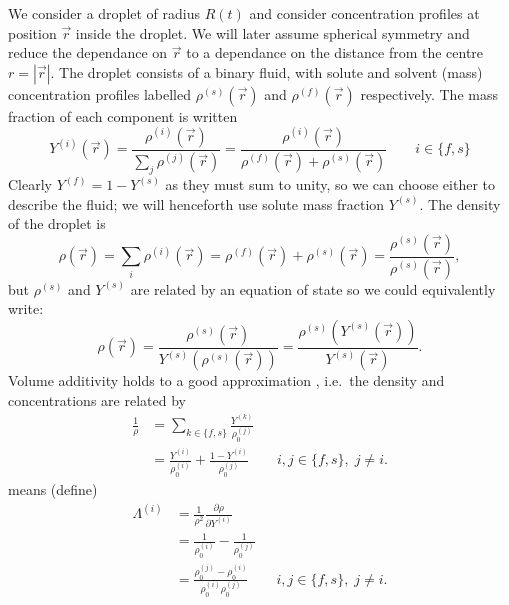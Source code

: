 \documentclass[12pt,twoside]{report}
\begin{document}
We consider a droplet of radius $R(t)$ and consider concentration profiles at position $\vec{r}$ inside the droplet.
We will later assume spherical symmetry and reduce the dependance on $\vec{r}$ to a dependance on the distance from the centre $r = |\vec{r}|$.
The droplet consists of a binary fluid, with solute and solvent (mass) concentration profiles labelled $\rho^{(s)}(\vec{r})$ and $\rho^{(f)}(\vec{r})$ respectively.
The mass fraction of each component is written
\begin{equation}\label{eq:mass-fraction}
  Y^{(i)}(\vec{r}) = \frac{\rho^{(i)}(\vec{r})}{\sum_j \rho^{(j)}(\vec{r})} = \frac{\rho^{(i)}(\vec{r})}{\rho^{(f)}(\vec{r}) + \rho^{(s)}(\vec{r})} \qquad i \in \{f, s\}
\end{equation}
Clearly $Y^{(f)} = 1 - Y^{(s)}$ as they must sum to unity, so we can choose either to describe the fluid;
we will henceforth use solute mass fraction $Y^{(s)}$.
The density of the droplet is
\begin{equation}
  \rho(\vec{r}) = \sum_i \rho^{(i)}(\vec{r}) = \rho^{(f)}(\vec{r}) + \rho^{(s)}(\vec{r}) = \frac{\rho^{(s)}(\vec{r})}{\rho^{(s)}(\vec{r})},
\end{equation}
but $\rho^{(s)}$ and $Y^{(s)}$ are related by an equation of state so we could equivalently write:
\begin{equation}
  \rho(\vec{r}) =
  \frac{\rho^{(s)}(\vec{r})}{Y^{(s)}(\rho^{(s)}(\vec{r}))} =
  \frac{\rho^{(s)}(Y^{(s)}(\vec{r}))}{Y^{(s)}(\vec{r})}.
\end{equation}
Volume additivity holds to a good approximation \cite{Handscomb???}, i.e.\ the density and concentrations are related by
\begin{equation}\label{eq:volume-additivity}
  \begin{aligned}
    \frac{1}{\rho} &=
    \sum_{k \in \{f,s\}} \frac{Y^{(k)}}{\rho^{(j)}_0} \\
    &=
    \frac{Y^{(i)}}{\rho^{(i)}_0} +
    \frac{1 - Y^{(i)}}{\rho^{(j)}_0}
    \qquad i,j \in \{f,s\}, \; j \ne i.
  \end{aligned}
\end{equation}
means
(define)
\begin{equation}\label{eq:density-lambda}
  \begin{aligned}
    \Lambda^{(i)} &=
    \frac{1}{\rho^2} \frac{\partial \rho}{\partial Y^{(i)}} \\
    &=
    \frac{1}{\rho^{(i)}_0} -
    \frac{1}{\rho^{(j)}_0}
    \\
    &=
    \frac{\rho^{(j)}_0 - \rho^{(i)}_0}{\rho^{(i)}_0\rho^{(j)}_0}
    \qquad i,j \in \{f,s\}, \; j \ne i.
  \end{aligned}
\end{equation}
\end{document}
